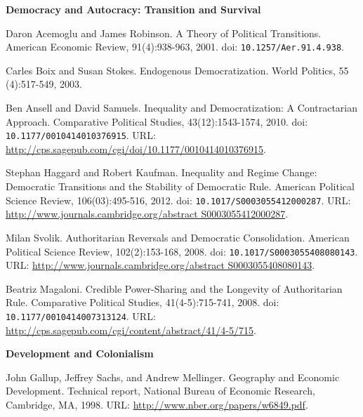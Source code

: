 \documentclass[letterpaper]{article}
\renewenvironment{itemize}{
  \begin{list}{}{
    \setlength{\leftmargin}{1.5em}
  }
}{
  \end{list}
}
\begin{document}
\begin{enumerate}
\item {\bf Democracy and Autocracy: Transition and Survival}
	\begin{itemize}
		\item[$\bullet$] Daron Acemoglu and James Robinson. A Theory of Political Transitions. American Economic Review, 91(4):938-963, 2001. doi: \texttt{10.1257/Aer.91.4.938}.
		\item[$\bullet$] Carles Boix and Susan Stokes. Endogenous Democratization. World Politics, 55 (4):517-549, 2003.
		\item[$\bullet$] Ben Ansell and David Samuels. Inequality and Democratization: A Contractarian Approach. Comparative Political Studies, 43(12):1543-1574, 2010. doi: \texttt{10.1177/0010414010376915}. URL: \url{http://cps.sagepub.com/cgi/doi/10.1177/0010414010376915}.
		\item[$\bullet$] Stephan Haggard and Robert Kaufman. Inequality and Regime Change: Democratic Transitions and the Stability of Democratic Rule. American Political Science Review, 106(03):495-516, 2012. doi: \texttt{10.1017/S0003055412000287}. URL: \url{http://www.journals.cambridge.org/abstract S0003055412000287}.
		\item[$\bullet$] Milan Svolik. Authoritarian Reversals and Democratic Consolidation. American Political Science Review, 102(2):153-168, 2008. doi: \texttt{10.1017/S0003055408080143}. URL: \url{http://www.journals.cambridge.org/abstract S0003055408080143}.
		\item[$\bullet$] Beatriz Magaloni. Credible Power-Sharing and the Longevity of Authoritarian Rule. Comparative Political Studies, 41(4-5):715-741, 2008. doi: \texttt{10.1177/0010414007313124}. URL: \url{http://cps.sagepub.com/cgi/content/abstract/41/4-5/715}.
	\end{itemize}



\item {\bf Development and Colonialism}
	\begin{itemize}
		\item[$\bullet$] John Gallup, Jeffrey Sachs, and Andrew Mellinger. Geography and Economic Development. Technical report, National Bureau of Economic Research, Cambridge, MA, 1998. URL: \url{http://www.nber.org/papers/w6849.pdf}.


\end{itemize}
\end{enumerate}
\end{document}
